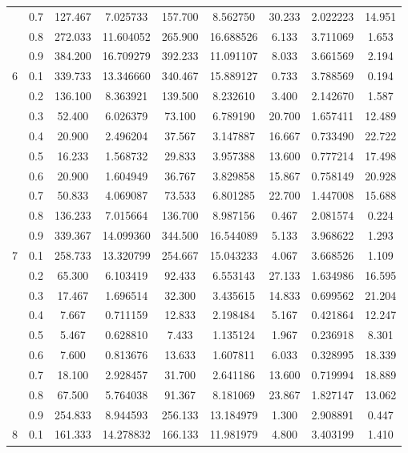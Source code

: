 \begin{longtable}{ | c | c || c | c | c | c | c | c | c | }
 & 0.7 & 127.467 & 7.025733 & 157.700 & 8.562750 & 30.233 & 2.022223 & 14.951 \\
 & 0.8 & 272.033 & 11.604052 & 265.900 & 16.688526 & 6.133 & 3.711069 & 1.653 \\
 & 0.9 & 384.200 & 16.709279 & 392.233 & 11.091107 & 8.033 & 3.661569 & 2.194 \\
 \hline
\multirow{9}{*}{6} & 0.1 & 339.733 & 13.346660 & 340.467 & 15.889127 & 0.733 & 3.788569 & 0.194 \\
 & 0.2 & 136.100 & 8.363921 & 139.500 & 8.232610 & 3.400 & 2.142670 & 1.587 \\
 & 0.3 & 52.400 & 6.026379 & 73.100 & 6.789190 & 20.700 & 1.657411 & 12.489 \\
 & 0.4 & 20.900 & 2.496204 & 37.567 & 3.147887 & 16.667 & 0.733490 & 22.722 \\
 & 0.5 & 16.233 & 1.568732 & 29.833 & 3.957388 & 13.600 & 0.777214 & 17.498 \\
 & 0.6 & 20.900 & 1.604949 & 36.767 & 3.829858 & 15.867 & 0.758149 & 20.928 \\
 & 0.7 & 50.833 & 4.069087 & 73.533 & 6.801285 & 22.700 & 1.447008 & 15.688 \\
 & 0.8 & 136.233 & 7.015664 & 136.700 & 8.987156 & 0.467 & 2.081574 & 0.224 \\
 & 0.9 & 339.367 & 14.099360 & 344.500 & 16.544089 & 5.133 & 3.968622 & 1.293 \\
 \hline
\multirow{9}{*}{7} & 0.1 & 258.733 & 13.320799 & 254.667 & 15.043233 & 4.067 & 3.668526 & 1.109 \\
 & 0.2 & 65.300 & 6.103419 & 92.433 & 6.553143 & 27.133 & 1.634986 & 16.595 \\
 & 0.3 & 17.467 & 1.696514 & 32.300 & 3.435615 & 14.833 & 0.699562 & 21.204 \\
 & 0.4 & 7.667 & 0.711159 & 12.833 & 2.198484 & 5.167 & 0.421864 & 12.247 \\
 & 0.5 & 5.467 & 0.628810 & 7.433 & 1.135124 & 1.967 & 0.236918 & 8.301 \\
 & 0.6 & 7.600 & 0.813676 & 13.633 & 1.607811 & 6.033 & 0.328995 & 18.339 \\
 & 0.7 & 18.100 & 2.928457 & 31.700 & 2.641186 & 13.600 & 0.719994 & 18.889 \\
 & 0.8 & 67.500 & 5.764038 & 91.367 & 8.181069 & 23.867 & 1.827147 & 13.062 \\
 & 0.9 & 254.833 & 8.944593 & 256.133 & 13.184979 & 1.300 & 2.908891 & 0.447 \\
 \hline
\multirow{9}{*}{8} & 0.1 & 161.333 & 14.278832 & 166.133 & 11.981979 & 4.800 & 3.403199 & 1.410 \\

\end{longtable}
